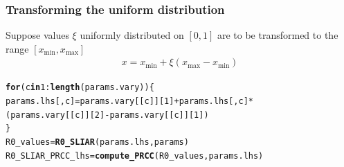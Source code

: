 \documentclass[aspectratio=169]{beamer}\usepackage[]{graphicx}\usepackage[]{xcolor}
\makeatletter
\newcommand{\hlnum}[1]{\textcolor[rgb]{0.686,0.059,0.569}{#1}}%
\newcommand{\hlopt}[1]{\textcolor[rgb]{0,0,0}{#1}}%
\newcommand{\hldef}[1]{\textcolor[rgb]{0.345,0.345,0.345}{#1}}%
\newcommand{\hlkwa}[1]{\textcolor[rgb]{0.161,0.373,0.58}{\textbf{#1}}}%
\newcommand{\hlkwb}[1]{\textcolor[rgb]{0.69,0.353,0.396}{#1}}%
\newcommand{\hlkwd}[1]{\textcolor[rgb]{0.737,0.353,0.396}{\textbf{#1}}}%
\newenvironment{kframe}{%
 \def\at@end@of@kframe{}%
 \ifinner\ifhmode%
  \def\at@end@of@kframe{\end{minipage}}%
  \begin{minipage}{\columnwidth}%
 \fi\fi%
 \def\FrameCommand##1{\hskip\@totalleftmargin \hskip-\fboxsep
 \colorbox{shadecolor}{##1}\hskip-\fboxsep
     \hskip-\linewidth \hskip-\@totalleftmargin \hskip\columnwidth}%
 \MakeFramed {\advance\hsize-\width
   \@totalleftmargin\z@ \linewidth\hsize
   \@setminipage}}%
 {\par\unskip\endMakeFramed%
 \at@end@of@kframe}
\newenvironment{knitrout}{}{} %
\makeatother
\begin{document}
\begin{frame}[fragile]\frametitle{Transforming the uniform distribution}
Suppose values $\xi$ uniformly distributed on $[0,1]$ are to be transformed to the range $[x_{\min},x_{\max}]$
\begin{align*}
x = x_{\min} + \xi (x_{\max} - x_{\min})
\end{align*}
\vfill
\begin{knitrout}
\color{fgcolor}\begin{kframe}
\begin{alltt}
\hlkwa{for} \hldef{(c} \hlkwa{in} \hlnum{1}\hlopt{:}\hlkwd{length}\hldef{(params.vary)) \{}
  \hldef{params.lhs[,c]} \hlkwb{=} \hldef{params.vary[[c]][}\hlnum{1}\hldef{]} \hlopt{+} \hldef{params.lhs[,c]} \hlopt{*}
    \hldef{(params.vary[[c]][}\hlnum{2}\hldef{]} \hlopt{-} \hldef{params.vary[[c]][}\hlnum{1}\hldef{])}
\hldef{\}}
\hldef{R0_values} \hlkwb{=} \hlkwd{R0_SLIAR}\hldef{(params.lhs, params)}
\hldef{R0_SLIAR_PRCC_lhs} \hlkwb{=} \hlkwd{compute_PRCC}\hldef{(R0_values, params.lhs)}
\end{alltt}
\end{kframe}
\end{knitrout}
\end{frame}
\end{document}
